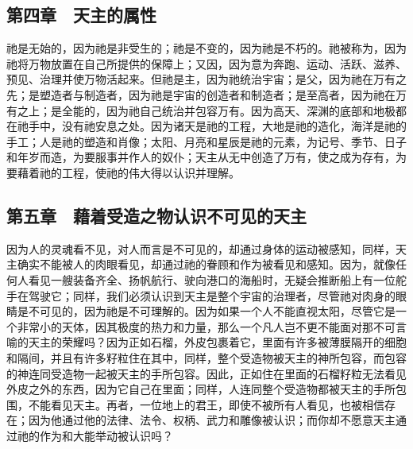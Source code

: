 
\subsection{第四章　天主的属性}

祂是无始的，因为祂是非受生的；祂是不变的，因为祂是不朽的。祂被称为，因为祂将万物放置在自己所提供的保障上；又因，因为意为奔跑、运动、活跃、滋养、预见、治理并使万物活起来。但祂是主，因为祂统治宇宙；是父，因为祂在万有之先；是塑造者与制造者，因为祂是宇宙的创造者和制造者；是至高者，因为祂在万有之上；是全能的，因为祂自己统治并包容万有。因为高天、深渊的底部和地极都在祂手中，没有祂安息之处。因为诸天是祂的工程，大地是祂的造化，海洋是祂的手工；人是祂的塑造和肖像；太阳、月亮和星辰是祂的元素，为记号、季节、日子和年岁而造，为要服事并作人的奴仆；天主从无中创造了万有，使之成为存有，为要藉着祂的工程，使祂的伟大得以认识并理解。\par


\subsection{第五章　藉着受造之物认识不可见的天主}

因为人的灵魂看不见，对人而言是不可见的，却通过身体的运动被感知，同样，天主确实不能被人的肉眼看见，却通过祂的眷顾和作为被看见和感知。因为，就像任何人看见一艘装备齐全、扬帆航行、驶向港口的海船时，无疑会推断船上有一位舵手在驾驶它；同样，我们必须认识到天主是整个宇宙的治理者，尽管祂对肉身的眼睛是不可见的，因为祂是不可理解的。因为如果一个人不能直视太阳，尽管它是一个非常小的天体，因其极度的热力和力量，那么一个凡人岂不更不能面对那不可言喻的天主的荣耀吗？因为正如石榴，外皮包裹着它，里面有许多被薄膜隔开的细胞和隔间，并且有许多籽粒住在其中，同样，整个受造物被天主的神所包容，而包容的神连同受造物一起被天主的手所包容。因此，正如住在里面的石榴籽粒无法看见外皮之外的东西，因为它自己在里面；同样，人连同整个受造物都被天主的手所包围，不能看见天主。再者，一位地上的君王，即使不被所有人看见，也被相信存在；因为他通过他的法律、法令、权柄、武力和雕像被认识；而你却不愿意天主通过祂的作为和大能举动被认识吗？\par



